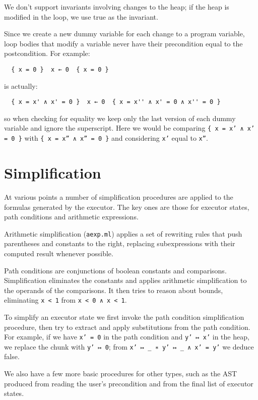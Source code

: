 \documentclass[parskip=half]{scrartcl}
\begin{document}
We don't support invariants involving changes to the heap; if the heap is modified in the loop, we use true as the invariant.

Since we create a new dummy variable for each change to a program variable, loop bodies that modify a variable never have their precondition equal to the postcondition. For example:
\begin{verbatim}
  { x = 0 }  x ← 0  { x = 0 }
\end{verbatim}
is actually:
\begin{verbatim}
  { x = x' ∧ x' = 0 }  x ← 0  { x = x'' ∧ x' = 0 ∧ x'' = 0 }
\end{verbatim}
so when checking for equality we keep only the last version of each dummy variable and ignore the superscript. Here we would be comparing \texttt{\{ x = x' ∧ x' = 0 \}} with \texttt{\{ x = x'' ∧ x'' = 0 \}} and considering \texttt{x'} equal to \texttt{x''}.

\section{Simplification}

At various points a number of simplification procedures are applied to the formulas generated by the executor. The key ones are those for executor states, path conditions and arithmetic expressions.

Arithmetic simplification (\texttt{aexp.ml}) applies a set of rewriting rules that push parentheses and constants to the right, replacing subexpressions with their computed result whenever possible.

Path conditions are conjunctions of boolean constants and comparisons. Simplification eliminates the constants and applies arithmetic simplification to the operands of the comparisons. It then tries to reason about bounds, \eg eliminating \texttt{x < 1} from \texttt{x < 0 ∧ x < 1}. %

To simplify an executor state we first invoke the path condition simplification procedure, then try to extract and apply substitutions from the path condition. For example, if we have \texttt{x' = 0} in the path condition and \texttt{y' ↦ x'} in the heap, we replace the chunk with \texttt{y' ↦ 0}; from \texttt{x' ↦ \_ ∗ y' ↦ \_ ∧ x' = y'} we deduce false.

We also have a few more basic procedures for other types, such as the AST produced from reading the user's precondition and from the final list of executor states.
\end{document}
